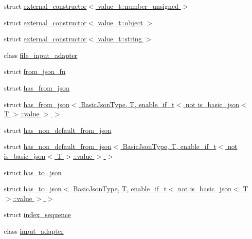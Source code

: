 \begin{DoxyCompactItemize}
\item 
struct \hyperlink{structnlohmann_1_1detail_1_1external__constructor_3_01value__t_1_1number__unsigned_01_4}{external\+\_\+constructor$<$ value\+\_\+t\+::number\+\_\+unsigned $>$}
\item 
struct \hyperlink{structnlohmann_1_1detail_1_1external__constructor_3_01value__t_1_1object_01_4}{external\+\_\+constructor$<$ value\+\_\+t\+::object $>$}
\item 
struct \hyperlink{structnlohmann_1_1detail_1_1external__constructor_3_01value__t_1_1string_01_4}{external\+\_\+constructor$<$ value\+\_\+t\+::string $>$}
\item 
class \hyperlink{classnlohmann_1_1detail_1_1file__input__adapter}{file\+\_\+input\+\_\+adapter}
\item 
struct \hyperlink{structnlohmann_1_1detail_1_1from__json__fn}{from\+\_\+json\+\_\+fn}
\item 
struct \hyperlink{structnlohmann_1_1detail_1_1has__from__json}{has\+\_\+from\+\_\+json}
\item 
struct \hyperlink{structnlohmann_1_1detail_1_1has__from__json_3_01BasicJsonType_00_01T_00_01enable__if__t_3_01not_5e786a91cad76ed1c14f425887b41640}{has\+\_\+from\+\_\+json$<$ Basic\+Json\+Type, T, enable\+\_\+if\+\_\+t$<$ not is\+\_\+basic\+\_\+json$<$ T $>$\+::value $>$ $>$}
\item 
struct \hyperlink{structnlohmann_1_1detail_1_1has__non__default__from__json}{has\+\_\+non\+\_\+default\+\_\+from\+\_\+json}
\item 
struct \hyperlink{structnlohmann_1_1detail_1_1has__non__default__from__json_3_01BasicJsonType_00_01T_00_01enable__a9e4562f31f7ed523e6e0f675606b0f2}{has\+\_\+non\+\_\+default\+\_\+from\+\_\+json$<$ Basic\+Json\+Type, T, enable\+\_\+if\+\_\+t$<$ not is\+\_\+basic\+\_\+json$<$ T $>$\+::value $>$ $>$}
\item 
struct \hyperlink{structnlohmann_1_1detail_1_1has__to__json}{has\+\_\+to\+\_\+json}
\item 
struct \hyperlink{structnlohmann_1_1detail_1_1has__to__json_3_01BasicJsonType_00_01T_00_01enable__if__t_3_01not_01737900a749c335e922e2f74e2face5e4}{has\+\_\+to\+\_\+json$<$ Basic\+Json\+Type, T, enable\+\_\+if\+\_\+t$<$ not is\+\_\+basic\+\_\+json$<$ T $>$\+::value $>$ $>$}
\item 
struct \hyperlink{structnlohmann_1_1detail_1_1index__sequence}{index\+\_\+sequence}
\item 
class \hyperlink{classnlohmann_1_1detail_1_1input__adapter}{input\+\_\+adapter}
\item 

\end{DoxyCompactItemize}
